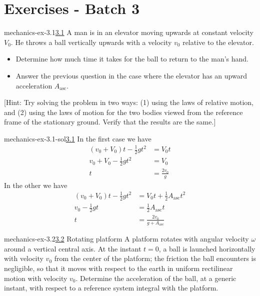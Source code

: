 \documentclass[preview]{standalone}
\begin{document}
\genpage

\section{Exercises - Batch 3}

\begin{snippetexercise}{mechanics-ex-3.1}{\underline{3.1}}
    A man is in an elevator moving upwards at constant velocity $V_0$. He throws a ball vertically upwards with a velocity $v_0$ relative to the elevator.
    \begin{itemize}
        \item Determine how much time it takes for the ball to return to the man's hand.
        \item Answer the previous question in the case where the elevator has an upward acceleration $A_{\text{asc}}$.
    \end{itemize}
    [Hint: Try solving the problem in two ways: (1) using the laws of relative motion, and (2) using the laws of motion for the two bodies viewed from the reference frame of the stationary ground. Verify that the results are the same.]
\end{snippetexercise}

\begin{snippetsolution}{mechanics-ex-3.1-sol}{\underline{3.1}}
    In the first case we have
    \begin{align*}
        (v_0+V_0)t - \frac{1}{2}gt^2 &= V_0t \\
        v_0 + V_0 - \frac{1}{2}gt^2 &= V_0 \\
        t &= \frac{2v_0}{g}
    \end{align*}
    In the other we have
    \begin{align*}
        (v_0 + V_0)t - \frac{1}{2}gt^2 &= V_0t + \frac{1}{2}A_{\text{asc}}t^2 \\
        v_0 - \frac{1}{2}gt &= \frac{1}{2}A_{\text{asc}}t \\
        t &= \frac{2v_0}{g+A_{\text{asc}}}
    \end{align*}
\end{snippetsolution}

\begin{snippetexercise}{mechanics-ex-3.2}{\underline{3.2} Rotating platform}
    A platform rotates with angular velocity
    \(\omega\) around a vertical central axis.
    At the instant \(t=0\), a ball is launched horizontally with velocity \(v_0\)
    from the center of the platform; the friction the ball encounters is negligible,
    so that it moves with respect to the earth in uniform rectilinear motion with velocity \(v_0\).
    Determine the acceleration of the ball, at a generic instant, with respect to a reference system
    integral with the platform.
\end{snippetexercise}
\end{document}
